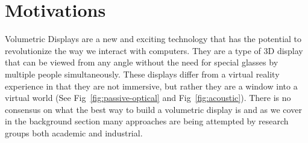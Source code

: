 \section{Motivations}

Volumetric Displays are a new and exciting technology that has the potential to revolutionize the way we interact with computers. They are a type of 3D display that can be viewed from any angle without the need for special glasses by multiple people simultaneously. \cite{1492264} These displays differ from a virtual reality experience in that they are not immersive, but rather they are a window into a virtual world (See Fig~\ref{fig:passive-optical} and Fig~\ref{fig:acoustic}). There is no consensus on what the best way to build a volumetric display is and as we cover in the background section many approaches are being attempted by research groups both academic and industrial.

